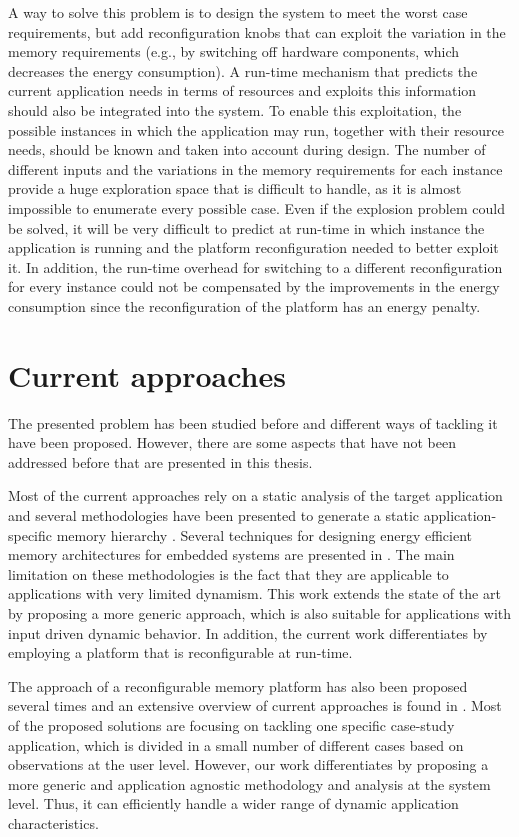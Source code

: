 A way to solve this problem is to design the system to meet the worst case requirements, but add reconfiguration knobs that can exploit the variation in the memory requirements (e.g., by switching off hardware components, which decreases the energy consumption).
A run-time mechanism that predicts the current application needs in terms of resources and exploits this information should also be integrated into the system.
To enable this exploitation, the possible instances in which the application may run, together with their resource needs, should be known and taken into account during design. 
The number of different inputs and the variations in the memory requirements for each instance provide a huge exploration space that is difficult to handle, as it is almost impossible to enumerate every possible case.
Even if the explosion problem could be solved, it will be very difficult to predict at run-time in which instance the application is running and the platform reconfiguration needed to better exploit it. 
In addition, the run-time overhead for switching to a different reconfiguration for every instance could not be  compensated by the improvements in the energy consumption since the reconfiguration of the platform has an energy penalty. 

\section{Current approaches}

The presented problem has been studied before and different ways of tackling it have been proposed.
However, there are some aspects that have not been addressed before that are presented in this thesis.

Most of the current approaches rely on a static analysis of the target application and several methodologies have been presented to generate a static application-specific memory hierarchy \cite{Ben00b}.
Several techniques for designing energy efficient memory architectures for embedded systems are presented in \cite{Mac02}. 
The main limitation on these methodologies is the fact that they are applicable to applications with very limited dynamism. 
This work extends the state of the art by proposing a more generic approach, which is also suitable for applications with input driven dynamic behavior.  
In addition, the current work differentiates by employing a platform that is reconfigurable at run-time.
 
The approach of a reconfigurable memory platform has also been proposed several times and an extensive overview of current approaches is found in \cite{Garcia}.
Most of the proposed solutions are focusing on tackling one specific case-study application, which is divided in a small number of different cases based on observations at the user level.
However, our work differentiates by proposing a more generic and application agnostic methodology and analysis at the system level.
Thus, it can efficiently handle a wider range of dynamic application characteristics.

